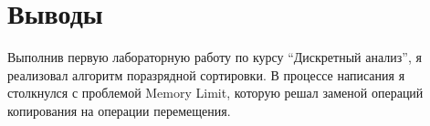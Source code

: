 \section{Выводы}
Выполнив первую лабораторную работу по курсу \enquote{Дискретный анализ}, я реализовал алгоритм поразрядной сортировки. В процессе написания я столкнулся 
с проблемой Memory Limit, которую решал заменой операций копирования на операции перемещения.
\pagebreak
